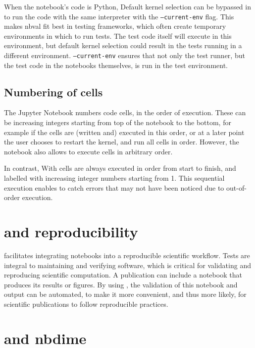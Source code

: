 \documentclass{deliverablereport}
\begin{document}
When the notebook's code is Python,
Default kernel selection can be bypassed in \nbval to run the code with the same interpreter
with the \texttt{--current-env} flag.
This makes nbval fit best in testing frameworks,
which often create temporary environments in which to run tests.
The test code itself will execute in this environment,
but default kernel selection could result in the tests running in a different environment.
\texttt{--current-env} ensures that not only the test runner,
but the test code in the notebooks themselves,
is run in the test environment.


\subsection{Numbering of cells}

The Jupyter Notebook numbers code cells, in the order of
execution. These can be increasing integers starting from top of the
notebook to the bottom, for example if the cells are (written and)
executed in this order, or at a later point the user chooses to
restart the kernel, and run all cells in order. However, the notebook
also allows to execute cells in arbitrary order.

In contrast, With \nbval cells are always executed in order from start
to finish, and labelled with increasing integer numbers starting from
1.  This sequential execution enables \nbval to catch errors that may
not have been noticed due to out-of-order execution.

\section{\nbval and reproducibility} %

\nbval facilitates integrating notebooks into a reproducible
scientific workflow.  Tests are integral to maintaining and verifying
software, which is critical for validating and reproducing scientific
computation.  A publication can include a notebook that produces its
results or figures.  By using \nbval, the validation of this notebook
and output can be automated, to make it more convenient, and thus more
likely, for scientific publications to follow reproducible practices.


\section{\nbval and nbdime} %
\label{sec:nbval-nbdime}
\end{document}
